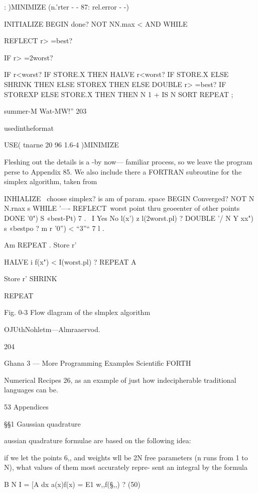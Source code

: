 {{{{{{: )MINIMIZE (n.'rter - - 87: rel.error - -)

INITIALIZE
BEGIN done? NOT NN.max < AND
WHILE

REFLECT r> =best?

IF r> =2worst?

IF r<worst? IF STORE.X THEN
HALVE r<worst?
IF STORE.X ELSE SHRINK THEN
ELSE STOREX THEN
ELSE DOUBLE r> =best?
IF STOREXP ELSE STORE.X THEN
THEN
N 1 + IS N SORT
REPEAT ;

summer-M Wat-MW!” 203

usedintheformat

USE( tnarne 20 96 1.6-4 )MINIMIZE

Fleshing out the details is a -by now— familiar process, so we
leave the program perse to Appendix 85. We also include there
a FORTRAN subroutine for the simplex algorithm, taken from

 

 

 

INHIALIZE \ choose simplex? is am of param. space
BEGIN
Converged? NOT N N.rnax s
WHILE
'—- REFLECT\ worst point thru geoeenter of other points
DONE '0") S «best-Pt) 7
.~
I
Yes No l(x') z l(2worst.pl) ?
DOUBLE '/\’
N Y
xx") s «bestpo ? m r ’0”) < “3”“ 7
l .

Am REPEAT .
Store r'

HALVE
i
f(x") < I(worst.pl) ?
REPEAT A

Store r' SHRINK

REPEAT

 

 

Fig. 0-3 Flow dlagram of the slmplex algorithm

OJUthNohletm—Almraaervod.

204

Ghana 3 — More Programming Examples Scientiﬁc FORTH

Numerical Recipes 26, as an example of just how indecipherable
traditional languages can be.

53 Appendices

§§1 Gaussian quadrature

aussian quadrature formulae are based on the following idea:

if we let the points 6,, and weights wll be 2N free parameters
(n runs from 1 to N), what values of them most accurately repre-
sent an integral by the formula

B N
I = [A dx a(x)f(x) = E1 w,,f(§,,) ? (50)

}}}}}}

